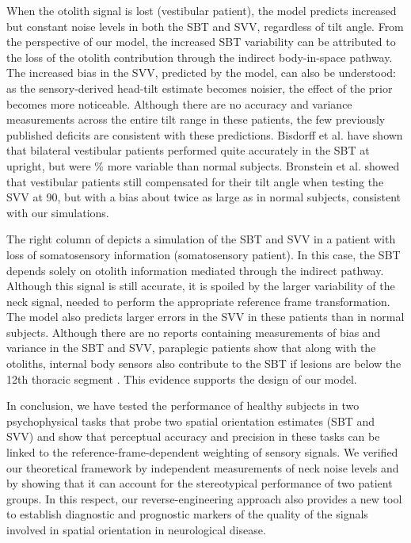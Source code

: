 When the otolith signal is lost (vestibular patient), the model predicts increased but constant noise levels in both the SBT and SVV, regardless of tilt angle. From the perspective of our model, the increased SBT variability can be attributed to the loss of the otolith contribution through the indirect body-in-space pathway. The increased bias in the SVV, predicted by the model, can also be understood: as the sensory-derived head-tilt estimate becomes noisier, the effect of the prior becomes more noticeable. Although there are no accuracy and variance measurements across the entire tilt range in these patients, the few previously published deficits are consistent with these predictions. Bisdorff et al. \citeyear{bisdorff1996} have shown that bilateral vestibular patients performed quite accurately in the SBT at upright, but were \% more variable than normal subjects. Bronstein et al. \citeyear{bronstein1996} showed that vestibular patients still compensated for their tilt angle when testing the SVV at 90\textdegree, but with a bias about twice as large as in normal subjects, consistent with our simulations. 

The right column of  depicts a simulation of the SBT and SVV in a patient with loss of somatosensory information (somatosensory patient). In this case, the SBT depends solely on otolith information mediated through the indirect pathway. Although this signal is still accurate, it is spoiled by the larger variability of the neck signal, needed to perform the appropriate reference frame transformation. The model also predicts larger errors in the SVV in these patients than in normal subjects. Although there are no reports containing measurements of bias and variance in the SBT and SVV, paraplegic patients show that along with the otoliths, internal body sensors also contribute to the SBT if lesions are below the 12th thoracic segment \cite{mittelstaedt1997}. This evidence supports the design of our model. 

In conclusion, we have tested the performance of healthy subjects in two psychophysical tasks that probe two spatial orientation estimates (SBT and SVV) and show that perceptual accuracy and precision in these tasks can be linked to the reference-frame-dependent weighting of sensory signals. We verified our theoretical framework by independent measurements of neck noise levels and by showing that it can account for the stereotypical performance of two patient groups. In this respect, our reverse-engineering approach also provides a new tool to establish diagnostic and prognostic markers of the quality of the signals involved in spatial orientation in neurological disease. 


